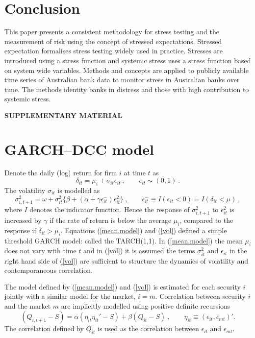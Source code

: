 \documentclass[authoryear]{elsarticle}
\newcommand{\eps}{\epsilon}
\newcommand{\eref}[1]{(\ref{#1})}
\newcommand{\cq}{\ , \qquad}
\newcommand{\be}[1]{\begin{equation}\label{#1}}
\newcommand{\ee}{\end{equation}}
\begin{document}
\section{Conclusion}\label{conclude}

This paper presents a consistent methodology for stress testing and the measurement of  risk using the concept of stressed expectations.   Stressed expectation  formalises stress testing widely used in practice.  Stresses are introduced using a stress function and systemic stress uses a stress function based on system wide variables.   Methods and concepts are applied to publicly available time series of Australian bank data to monitor stress in Australian banks over time.   The methods identity banks in distress and those with high contribution to systemic stress.

\bigskip
\begin{center}
{\large\bf SUPPLEMENTARY MATERIAL}
\end{center}

\appendix
\renewcommand*{\thesection}{\Alph{section}}

\section{GARCH--DCC model}\label{garchdcc}

Denote the daily (log) return for firm $i$ at time $t$ as
\newcommand{\vareps}{\varepsilon}
\be{mean.model}
\delta_{it}=\mu_i+\sigma_{it}\eps_{it}\cq \eps_{it}\sim (0,1)\ .
\ee
The volatility $\sigma_{it}$ is modelled as
\be{vol}
\sigma_{i,t+1}^2 = \omega+ \sigma^2_{it}\{\beta+(\alpha+\gamma \eps^-_{it})\eps_{it}^2\}  \cq  \eps^-_{it}\equiv I(\eps_{it}<0)=I(\delta_{it}<\mu)\ ,
\ee
where $I$ denotes the indicator function.  Hence the response of $\sigma_{i,t+1}^2$ to $\eps_{it}^2$  is increased by $\gamma$   if
the rate of return is below the average $\mu_i$, compared to the response if $\delta_{it}>\mu_i$.  Equations \eref{mean.model} and \eref{vol} defined a simple threshold GARCH model:  called the TARCH(1,1).   In \eref{mean.model} the mean $\mu_i$ does not vary with time $t$ and in \eref{vol} it is assumed the terms  $\sigma_{it}^2$ and $\eps_{it}$ in the right hand side of \eref{vol} are sufficient to structure the dynamics of volatility and contemporaneous correlation.

The model defined by \eref{mean.model} and \eref{vol} is estimated  for each security $i$ jointly with  a similar model for  the market,  $i=m$.   Correlation between security $i$ and the market $m$ are implicitly modelled using  positive definite recursions   \citep{engle2002dynamic}
$$
(Q_{i,t+1}-S) = \alpha (\eta_{it}\eta_{it}'-S) + \beta (Q_{it}-S)\cq \eta_{it}\equiv(\eps_{it},\eps_{mt})' .
$$
The correlation defined by $Q_{it}$ is used as the correlation between $\eps_{it}$ and $\eps_{mt}$.
\end{document}
